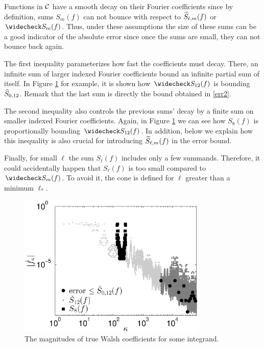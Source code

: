 \documentclass[graybox]{svmult}
\begin{document}
Functions in $\mathcal{C}$ have a smooth decay on their Fourier coefficients since by definition, sums $S_m(f)$ can not bounce with respect to $\widehat{S}_{\ell,m}(f)$ or $\wcS_m(f)$. Thus, under these assumptions the size of these sums can be a good indicator of the absolute error since once the sums are small, they can not bounce back again.

The first inequality parameterizes how fast the coefficients must decay. There, an infinite sum of larger indexed Fourier coefficients bound an infinite partial sum of itself. In Figure \ref{Walshcoeffig} for example, it is shown how $\wcS_{12}(f)$ is bounding $\widehat{S}_{0,12}$. Remark that the last sum is directly the bound obtained in \eqref{err2}.

The second inequality also controls the previous sums' decay by a finite sum on smaller indexed Fourier coefficients. Again, in Figure \ref{Walshcoeffig} we can see how $S_8(f)$ is proportionally bounding $\wcS_{12}(f)$. In addition, below we explain how this inequality is also crucial for introducing $\widetilde{S}_{\ell,m}(f)$ in the error bound.

Finally, for small $\ell$ the sum $S_\ell(f)$ includes only a few summands. Therefore, it could accidentally happen that $S_\ell(f)$ is too small compared to $\wcS_m(f)$. To avoid it, the cone is defined for $\ell$ greater than a minimum $\ell_*$.
\begin{figure}
\centering
\includegraphics[width=9cm]{Images/PlotFFTCoefUse256.eps}
\caption{The magnitudes of true Walsh coefficients for some integrand. \label{Walshcoeffig}}
\end{figure}
\end{document}
